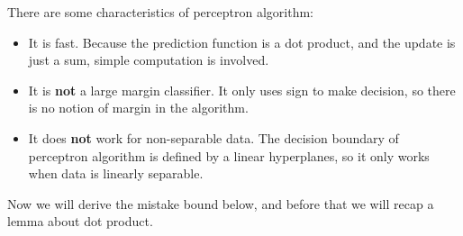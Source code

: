 \documentclass[11pt]{article}
\begin{document}
There are some characteristics of perceptron algorithm:
\begin{itemize}
\item It is fast. Because the prediction function is a dot product, and the update is just a sum, simple computation is involved.
\item It is \textbf{not} a large margin classifier. It only uses sign to make decision, so there is no notion of margin in the algorithm. 
\item It does \textbf{not} work for non-separable data. The decision boundary of perceptron algorithm is defined by a linear hyperplanes, so it only works when data is linearly separable. 
\end{itemize}

Now we will derive the mistake bound below, and before that we will recap a lemma about dot product.

\label{lemma:dotproduct}
\end{document}
